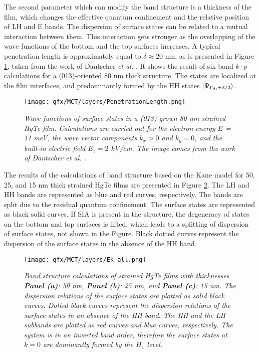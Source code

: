 \documentclass[titlepage,a4paper]{book}
\begin{document}
The second parameter which can modify the band structure is a thickness of the film, which changes the effective quantum confinement and the relative position of LH and E bands. The dispersion of surface states can be related to a mutual interaction between them. This interaction gets stronger as the overlapping of the wave functions of the bottom and the top surfaces increases. A typical penetration length is approximately equal to $\delta \approx 20$ nm, as is presented in Figure \ref{fig:PenetrationLength}, taken from the work of Dantscher \textit{et al.} \cite{Ganichev_MCT_layers}. It shows the result of six-band $k\cdot p$ calculations for a (013)-oriented 80 nm thick structure. The states are localized at the film interfaces, and predominantly formed by the HH states $\ket{\Psi_{\Gamma_8, \pm 3/2}}$. 
\begin{figure}[ht]
	\centering
	\texttt{[image: gfx/MCT/layers/PenetrationLength.png]}
	\vspace{-10pt}
	\caption{\textit{Wave functions of surface states in a (013)-grown 80 nm strained HgTe film. Calculations are carried out for the electron energy $E$ = 11 meV, the wave vector components $k_x > 0$ and $k_y = 0$, and the built-in electric field $E_z = 2$ kV/cm. The image comes from the work of Dantscher \textit{et al.} \cite{Ganichev_MCT_layers}.}}
	\label{fig:PenetrationLength}
\end{figure} 

The results of the calculations of band structure based on the Kane model for 50, 25, and 15 nm thick strained HgTe films are presented in Figure \ref{fig:Ek_all}. The LH and HH bands are represented as blue and red curves, respectively. The bands are split due to the residual quantum confinement. The surface states are represented as black solid curves. If SIA is present in the structure, the degeneracy of states on the bottom and top surfaces is lifted, which leads to a splitting of dispersion of surface states, not shown in the Figure. Black dotted curves represent the dispersion of the surface states in the absence of the HH band. 

\begin{figure}[H]
	\centering
	\texttt{[image: gfx/MCT/layers/Ek\_all.png]}
	\vspace{-10pt}
	\caption{\textit{Band structure calculations of strained HgTe films with thicknesses \textbf{Panel (a)}: 50 nm, \textbf{Panel (b)}: 25 nm, and \textbf{Panel (c)}: 15 nm. The dispersion relations of the surface states are plotted as solid black curves. Dotted black curves represent the dispersion relations of the surface states in an absence of the HH band. The HH and the LH subbands are plotted as red curves and blue curves, respectively. The system is in an inverted band order, therefore the surface states at $k = 0$ are dominantly formed by the $H_1$ level.}}
	\label{fig:Ek_all}
\end{figure} 
\end{document}

